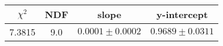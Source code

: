 \begin{tabular}{|c|c|c|c|}

\hline
$\chi^{2}$ & NDF & slope & y-intercept  \\
\hline
7.3815 & 9.0 & $0.0001\pm0.0002$ & $0.9689\pm0.0311$ \\
\hline

\end{tabular}